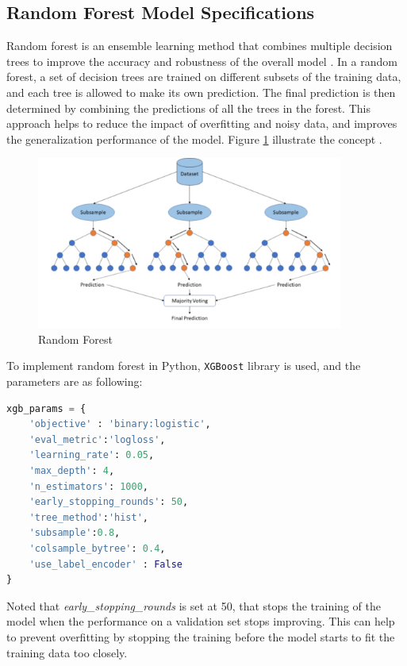 \documentclass[11pt,a4paper]{article}
\begin{document}
    \subsection{Random Forest Model Specifications}
    Random forest is an ensemble learning method that combines multiple decision trees to improve the accuracy and robustness of the overall model \cite{Cutler2012}. In a random forest, a set of decision trees are trained on different subsets of the training data, and each tree is allowed to make its own prediction. The final prediction is then determined by combining the predictions of all the trees in the forest. This approach helps to reduce the impact of overfitting and noisy data, and improves the generalization performance of the model. Figure \ref{fig:random_forest} illustrate the concept \cite{random_forest}.
    \begin{figure}[H]
        \centering
        \includegraphics[width = 0.9\textwidth]{model_plot/Random-Forest-Algorithm-Dataset-is-split-into-subsamples-and-each-tree-like-structure.pdf}
        \caption{Random Forest}
        \label{fig:random_forest}
    \end{figure}

    \noindent
    To implement random forest in Python, \texttt{XGBoost} \cite{xgb} library is used, and the parameters are as following:
    \begin{lstlisting}[language = Python, caption = XGBoost Parameters]
xgb_params = {
    'objective' : 'binary:logistic',
    'eval_metric':'logloss',
    'learning_rate': 0.05,
    'max_depth': 4,
    'n_estimators': 1000,
    'early_stopping_rounds': 50,
    'tree_method':'hist',
    'subsample':0.8,
    'colsample_bytree': 0.4,
    'use_label_encoder' : False
}    \end{lstlisting}
    \noindent
    Noted that \textit{early\_stopping\_rounds} is set at 50, that stops the training of the model when the performance on a validation set stops improving. This can help to prevent overfitting by stopping the training before the model starts to fit the training data too closely.
    
\end{document}
